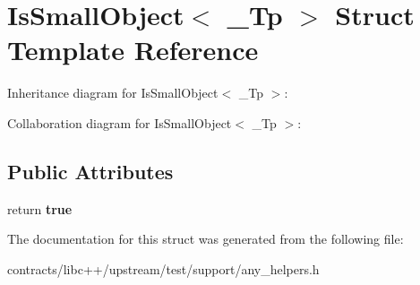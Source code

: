 \hypertarget{struct_is_small_object}{}\section{Is\+Small\+Object$<$ \+\_\+\+Tp $>$ Struct Template Reference}
\label{struct_is_small_object}


Inheritance diagram for Is\+Small\+Object$<$ \+\_\+\+Tp $>$\+:


Collaboration diagram for Is\+Small\+Object$<$ \+\_\+\+Tp $>$\+:
\subsection*{Public Attributes}
\begin{DoxyCompactItemize}
\item 
\mbox{\label{struct_is_small_object_a5707aa2b2028262de117ccdd7676a37d}} 
return {\bfseries true}
\end{DoxyCompactItemize}


The documentation for this struct was generated from the following file\+:\begin{DoxyCompactItemize}
\item 
contracts/libc++/upstream/test/support/any\+\_\+helpers.\+h\end{DoxyCompactItemize}
